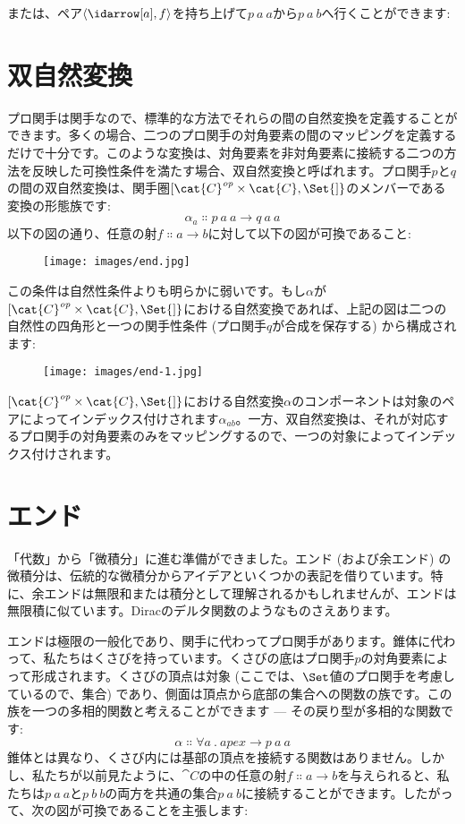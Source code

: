 または、ペア$\langle \idarrow[a], f \rangle$を持ち上げて$p\ a\ a$から$p\ a\ b$へ行くことができます: 


\section{双自然変換}

プロ関手は関手なので、標準的な方法でそれらの間の自然変換を定義することができます。多くの場合、二つのプロ関手の対角要素の間のマッピングを定義するだけで十分です。このような変換は、対角要素を非対角要素に接続する二つの方法を反映した可換性条件を満たす場合、双自然変換と呼ばれます。プロ関手$p$と$q$の間の双自然変換は、関手圏${[}\cat{C}^\mathit{op}\times{}\cat{C}, \Set{]}$のメンバーである変換の形態族です: 
\[\alpha_a \Colon p\ a\ a \to q\ a\ a\]
以下の図の通り、任意の射$f \Colon a \to b$に対して以下の図が可換であること: 

\begin{figure}[H]
  \centering
  \texttt{[image: images/end.jpg]}
\end{figure}

\noindent
この条件は自然性条件よりも明らかに弱いです。もし$\alpha$が${[}\cat{C}^\mathit{op}\times{}\cat{C}, \Set{]}$における自然変換であれば、上記の図は二つの自然性の四角形と一つの関手性条件 (プロ関手$q$が合成を保存する) から構成されます: 

\begin{figure}[H]
  \centering
  \texttt{[image: images/end-1.jpg]}
\end{figure}

\noindent
${[}\cat{C}^\mathit{op}\times{}\cat{C}, \Set{]}$における自然変換$\alpha$のコンポーネントは対象のペアによってインデックス付けされます$\alpha_{a b}$。一方、双自然変換は、それが対応するプロ関手の対角要素のみをマッピングするので、一つの対象によってインデックス付けされます。

\section{エンド}

「代数」から「微積分」に進む準備ができました。エンド (および余エンド) の微積分は、伝統的な微積分からアイデアといくつかの表記を借りています。特に、余エンドは無限和または積分として理解されるかもしれませんが、エンドは無限積に似ています。Diracのデルタ関数のようなものさえあります。

エンドは極限の一般化であり、関手に代わってプロ関手があります。錐体に代わって、私たちはくさびを持っています。くさびの底はプロ関手$p$の対角要素によって形成されます。くさびの頂点は対象 (ここでは、$\Set$値のプロ関手を考慮しているので、集合) であり、側面は頂点から底部の集合への関数の族です。この族を一つの多相的関数と考えることができます --- その戻り型が多相的な関数です: 
\[\alpha \Colon \forall a\ .\ \mathit{apex} \to p\ a\ a\]
錐体とは異なり、くさび内には基部の頂点を接続する関数はありません。しかし、私たちが以前見たように、$\cat{C}$の中の任意の射$f \Colon a \to b$を与えられると、私たちは$p\ a\ a$と$p\ b\ b$の両方を共通の集合$p\ a\ b$に接続することができます。したがって、次の図が可換であることを主張します: 

